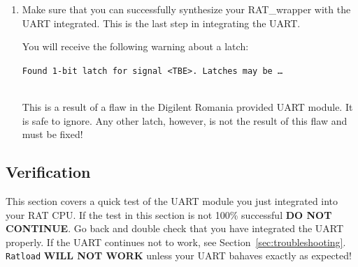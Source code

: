 \documentclass[notitlepage]{article}
\newcommand{\warningsign}{\fontencoding{U}\fontfamily{futs}\Large\selectfont\char 66\relax}
\begin{document}
\begin {enumerate}
\begin{lstlisting}
CONSTANT UART_OUT_ID   : STD_LOGIC_VECTOR(7 downto 0) := x"0E";

outputs: process(CLK) begin
   if (rising_edge(CLK)) then
      s_d_strb <= '0';
      s_d_conf <= '0';
      if (S_IO_OE = '1') then
         if (s_port_id = LEDS_ID) then
            LEDS <= s_output_port;
         elsif (s_port_id = UART_OUT_ID) then
            s_db_from_rat <= s_output_port;
            s_d_strb <= '1';
            s_d_conf <= '1';
         end if;
      end if;
   end if;
end process outputs;
\end{lstlisting}

\item Make sure that you can successfully synthesize your RAT\_wrapper with the UART integrated. This is the last step in integrating the UART.
\begin{infobox}
  \textbf{{\warningsign}} You will receive the following warning about a latch:\\
    \centerline{\texttt{Found 1-bit latch for signal \textless TBE\textgreater. Latches may be \ldots}}\\
    This is a result of a flaw in the Digilent Romania provided UART module. It is safe to ignore. Any other latch, however, is not the result of this flaw and must be fixed!
\end{infobox}
\end{enumerate}

\subsection{Verification}
This section covers a quick test of the UART module you just integrated into your RAT CPU. If the test in this section is not 100\% successful \textbf{DO NOT CONTINUE}. Go back and double check that you have integrated the UART properly. If the UART continues not to work, see Section~\ref{sec:troubleshooting}. \texttt{Ratload} \textbf{WILL NOT WORK} unless your UART bahaves exactly as expected!
\end{document}
